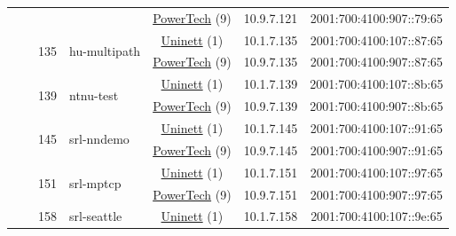 \begin{small}
\begin{center}
\begin{longtable}{|c|c|c|c|c|c|c|c|}
  &  &  &  & \multicolumn{2}{|c|}{\tiny{\href{http://www.powertech.no}{PowerTech} (9)}} & \tiny{10.9.7.121} & \tiny{2001:700:4100:907::79:65} \\* \cline{3-3}\cline{4-4}\cline{5-5}\cline{6-6}\cline{7-7}\cline{8-8}
  &  & \multirow{2}{*}{\tiny{135}} & \multicolumn{1}{|l|}{\multirow{2}{*}{\tiny{hu-multipath}}} & \multicolumn{2}{|c|}{\tiny{\href{https://www.uninett.no}{Uninett} (1)}} & \tiny{10.1.7.135} & \tiny{2001:700:4100:107::87:65} \\* \cline{5-5}\cline{6-6}\cline{7-7}\cline{8-8}
  &  &  &  & \multicolumn{2}{|c|}{\tiny{\href{http://www.powertech.no}{PowerTech} (9)}} & \tiny{10.9.7.135} & \tiny{2001:700:4100:907::87:65} \\* \cline{3-3}\cline{4-4}\cline{5-5}\cline{6-6}\cline{7-7}\cline{8-8}
  &  & \multirow{2}{*}{\tiny{139}} & \multicolumn{1}{|l|}{\multirow{2}{*}{\tiny{ntnu-test}}} & \multicolumn{2}{|c|}{\tiny{\href{https://www.uninett.no}{Uninett} (1)}} & \tiny{10.1.7.139} & \tiny{2001:700:4100:107::8b:65} \\* \cline{5-5}\cline{6-6}\cline{7-7}\cline{8-8}
  &  &  &  & \multicolumn{2}{|c|}{\tiny{\href{http://www.powertech.no}{PowerTech} (9)}} & \tiny{10.9.7.139} & \tiny{2001:700:4100:907::8b:65} \\* \cline{3-3}\cline{4-4}\cline{5-5}\cline{6-6}\cline{7-7}\cline{8-8}
  &  & \multirow{2}{*}{\tiny{145}} & \multicolumn{1}{|l|}{\multirow{2}{*}{\tiny{srl-nndemo}}} & \multicolumn{2}{|c|}{\tiny{\href{https://www.uninett.no}{Uninett} (1)}} & \tiny{10.1.7.145} & \tiny{2001:700:4100:107::91:65} \\* \cline{5-5}\cline{6-6}\cline{7-7}\cline{8-8}
  &  &  &  & \multicolumn{2}{|c|}{\tiny{\href{http://www.powertech.no}{PowerTech} (9)}} & \tiny{10.9.7.145} & \tiny{2001:700:4100:907::91:65} \\* \cline{3-3}\cline{4-4}\cline{5-5}\cline{6-6}\cline{7-7}\cline{8-8}
  &  & \multirow{2}{*}{\tiny{151}} & \multicolumn{1}{|l|}{\multirow{2}{*}{\tiny{srl-mptcp}}} & \multicolumn{2}{|c|}{\tiny{\href{https://www.uninett.no}{Uninett} (1)}} & \tiny{10.1.7.151} & \tiny{2001:700:4100:107::97:65} \\* \cline{5-5}\cline{6-6}\cline{7-7}\cline{8-8}
  &  &  &  & \multicolumn{2}{|c|}{\tiny{\href{http://www.powertech.no}{PowerTech} (9)}} & \tiny{10.9.7.151} & \tiny{2001:700:4100:907::97:65} \\* \cline{3-3}\cline{4-4}\cline{5-5}\cline{6-6}\cline{7-7}\cline{8-8}
  &  & \multirow{2}{*}{\tiny{158}} & \multicolumn{1}{|l|}{\multirow{2}{*}{\tiny{srl-seattle}}} & \multicolumn{2}{|c|}{\tiny{\href{https://www.uninett.no}{Uninett} (1)}} & \tiny{10.1.7.158} & \tiny{2001:700:4100:107::9e:65} \\* \cline{5-5}\cline{6-6}\cline{7-7}\cline{8-8}

\end{longtable}
\end{center}
\end{small}
